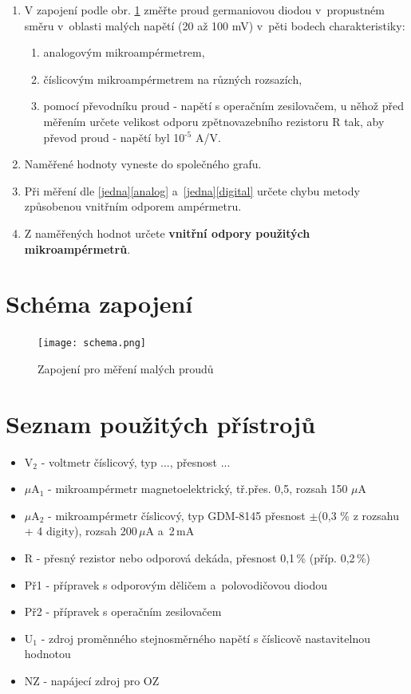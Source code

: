 \documentclass[a4paper,12pt]{article}   %
\newcommand{\tsub}[1]{$_\textrm{#1}$}
\newcommand{\texp}[1]{$^\textrm{#1}$}
\newcommand{\tmu}{$\mu$}
\newcommand{\tpm}{$\pm$}
\begin{document}
\label{zadani}
\begin{enumerate}
    \item V zapojení podle obr. \ref{fig:schema} změřte proud germaniovou diodou v~propustném směru v~oblasti malých napětí (20 až 100 mV) v~pěti bodech charakteristiky:\label{jedna}
    \begin{enumerate}[label=\alph*)]
        \item analogovým mikroampérmetrem,\label{analog}
        \item číslicovým mikroampérmetrem na různých rozsazích,\label{digital}
        \item pomocí převodníku proud - napětí s operačním zesilovačem, u něhož před měřením určete velikost odporu zpětnovazebního rezistoru R tak, aby převod proud - napětí byl 10\texp{-5} A/V.
    \end{enumerate}
    \item Naměřené hodnoty vyneste do společného grafu.
    \item Při měření dle \ref{jedna}\ref{analog} a~\ref{jedna}\ref{digital} určete chybu metody způsobenou vnitřním odporem ampérmetru.
    \item Z naměřených hodnot určete \textbf{vnitřní odpory použitých mikroampérmetrů}.
\end{enumerate}



\section{Schéma zapojení}

\label{schema_zapojeni}
\begin{figure}[h!]
    \centering
    \texttt{[image: schema.png]}
    \caption{Zapojení pro měření malých proudů \cite{navod}}
    \label{fig:schema}
\end{figure}



\section{Seznam použitých přístrojů}

\begin{itemize}
    \item V\tsub{2} - voltmetr číslicový, typ ..., přesnost ...
    \item $\mu$A\tsub{1} - mikroampérmetr magnetoelektrický, tř.přes. 0,5, rozsah 150 \tmu A
    \item $\mu$A\tsub{2} - mikroampérmetr číslicový, typ GDM-8145 přesnost \tpm (0,3 \% z rozsahu + 4 digity), rozsah 200\,\tmu A a~2\,mA
    \item R - přesný rezistor nebo odporová dekáda, přesnost 0,1\,\% (příp. 0,2\,\%)
    \item Př1 - přípravek s odporovým děličem a~polovodičovou diodou
    \item Př2 - přípravek s operačním zesilovačem
    \item U\tsub{1} - zdroj proměnného stejnosměrného napětí s číslicově nastavitelnou hodnotou 
    \item NZ - napájecí zdroj pro OZ
\end{itemize}
\end{document}
